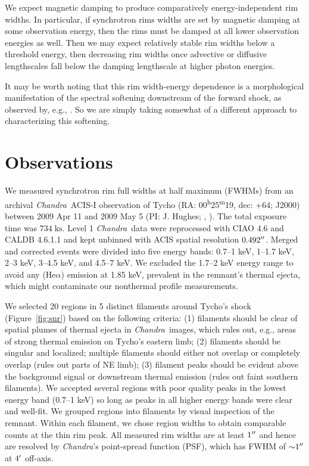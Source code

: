 \documentclass[iop, apj, numberedappendix]{emulateapj}
\newcommand*{\mt}{\mathrm}
\newcommand*{\unit}[1]{\;\mt{#1}}  %
\newcommand*{\abt}{\mathord{\sim}} %
\newcommand*{\tsup}{\textsuperscript}
\newcommand*{\Chandra}{\textit{Chandra}\ }
\begin{document}
We expect magnetic damping to produce comparatively energy-independent rim
widths.  In particular, if synchrotron rims widths are set by magnetic damping
at some observation energy, then the rims must be damped at all lower
observation energies as well.  Then we may expect relatively stable rim widths
below a threshold energy, then decreasing rim widths once advective or
diffusive lengthscales fall below the damping lengthscale at higher photon
energies.

It may be worth noting that this rim width-energy dependence is a morphological
manifestation of the spectral softening downstream of the forward shock, as
observed by, e.g., \citet{cassam-chenai2007}.  So we are simply taking somewhat
of a different approach to characterizing this softening.

\section{Observations}
\label{sec:observations}

We measured synchrotron rim full widths at half maximum (FWHMs) from an
archival \Chandra ACIS-I observation of Tycho
(RA: 00\tsup{h}25\tsup{m}19, dec: +64; J2000)
between 2009 Apr 11 and 2009 May 5 (PI: J. Hughes;
,
).
The total exposure time was $734 \unit{ks}$.
Level 1 \Chandra data were reprocessed with CIAO 4.6 and CALDB 4.6.1.1 and kept
unbinned with ACIS spatial resolution $0.492\mbox{$^{\prime\prime}$}$.
Merged and corrected events were divided into five energy bands:
0.7--1 keV, 1--1.7 keV, 2--3 keV, 3--4.5 keV, and 4.5--7 keV.
We excluded the 1.7--2 keV energy range to avoid any  (He$\alpha$)
emission at 1.85 keV, prevalent in the remnant's thermal ejecta, which
might contaminate our nonthermal profile measurements.

We selected 20 regions in 5 distinct filaments around Tycho's shock
(Figure~\ref{fig:snr}) based on the following criteria: (1) filaments should be
clear of spatial plumes of thermal ejecta in \Chandra images, which rules out,
e.g., areas of strong thermal emission on Tycho's eastern limb; (2) filaments
should be singular and localized; multiple filaments should either not
overlap or completely overlap (rules out parts of NE limb); (3) filament
peaks should be evident above the background signal or downstream thermal
emission (rules out faint southern filaments).  We accepted several
regions with poor quality peaks in the lowest energy band (0.7--1 keV) so long
as peaks in all higher energy bands were clear and well-fit.
We grouped regions into filaments by visual inspection of the remnant.
Within each filament, we chose region widths to obtain comparable counts
at the thin rim peak.
All measured rim widths are at least $1\mbox{$^{\prime\prime}$}$ and hence are resolved by
\textit{Chandra}'s point-spread function (PSF), which has FWHM of
$\abt 1\arcsec$ at $4\mbox{$^\prime$}$ off-axis.
\end{document}
